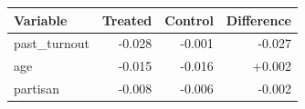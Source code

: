\begin{tabular}{lrrr}
\toprule
Variable & Treated & Control & Difference \\
\midrule
past\_turnout & -0.028 & -0.001 & -0.027 \\
age & -0.015 & -0.016 & +0.002 \\
partisan & -0.008 & -0.006 & -0.002 \\
\bottomrule
\end{tabular}
